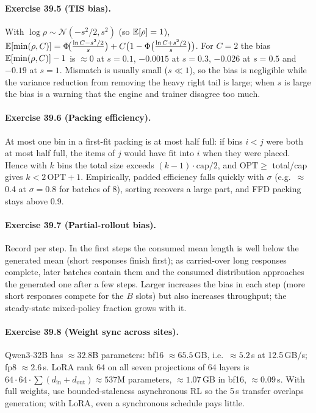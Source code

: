 \paragraph{Exercise 39.5 (TIS bias).}
With $\log\rho\sim\mathcal{N}(-s^2/2,s^2)$ (so $\mathbb{E}[\rho]=1$),
$\mathbb{E}[\min(\rho,C)]=\Phi\!\big(\tfrac{\ln C-s^2/2}{s}\big)+C\big(1-\Phi\big(\tfrac{\ln C+s^2/2}{s}\big)\big)$.
For $C=2$ the bias $\mathbb{E}[\min(\rho,C)]-1$ is $\approx0$ at $s=0.1$, $-0.0015$ at $s=0.3$, $-0.026$ at
$s=0.5$ and $-0.19$ at $s=1$. Mismatch is usually small ($s\ll1$), so the bias is negligible while
the variance reduction from removing the heavy right tail is large; when $s$ is large the bias is a
warning that the engine and trainer disagree too much.

\paragraph{Exercise 39.6 (Packing efficiency).}
At most one bin in a first-fit packing is at most half full: if bins $i<j$ were both at most half
full, the items of $j$ would have fit into $i$ when they were placed. Hence with $k$ bins the total
size exceeds $(k-1)\cdot\text{cap}/2$, and $\mathrm{OPT}\ge$ total/cap gives $k<2\,\mathrm{OPT}+1$.
Empirically, padded efficiency falls quickly with $\sigma$ (e.g.\ $\approx$0.4 at $\sigma=0.8$ for
batches of 8), sorting recovers a large part, and FFD packing stays above 0.9.

\paragraph{Exercise 39.7 (Partial-rollout bias).}
Record  per step. In the first steps the consumed mean length is well
below the generated mean (short responses finish first); as carried-over long responses complete,
later batches contain them and the consumed distribution approaches the generated one after a few
steps. Larger  increases the bias in each step (more short responses compete for
the $B$ slots) but also increases throughput; the steady-state mixed-policy fraction grows with it.

\paragraph{Exercise 39.8 (Weight sync across sites).}
Qwen3-32B has $\approx32.8$B parameters: bf16 $\approx65.5$\,GB, i.e.\ $\approx5.2$\,s at
12.5\,GB/s; fp8 $\approx2.6$\,s. LoRA rank 64 on all seven projections of 64 layers is
$64\cdot64\cdot\sum(d_{\text{in}}+d_{\text{out}})\approx 537$M parameters, $\approx1.07$\,GB in bf16,
$\approx0.09$\,s. With full weights, use bounded-staleness asynchronous RL so the 5\,s transfer overlaps
generation; with LoRA, even a synchronous schedule pays little.

